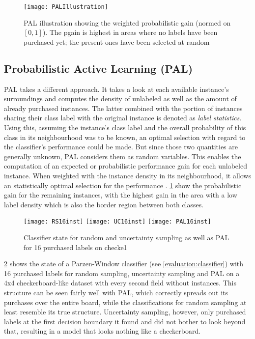 \begin{figure}[h]
	\centering
	\texttt{[image: PALIllustration]}
	\caption{PAL illustration showing the weighted probabilistic gain (normed on $[0, 1]$). The pgain is highest in areas where no labels have been purchased yet; the present ones have been selected at random}
	\label{fig:PALIllustration}
\end{figure}

\subsection{Probabilistic Active Learning (PAL)}
PAL takes a different approach. It takes a look at each available instance's surroundings and computes the density of unlabeled as well as the amount of already purchased instances. The latter combined with the portion of instances sharing their class label with the original instance is denoted as \textit{label statistics}. Using this, assuming the instance's class label and the overall probability of this class in its neighbourhood was to be known, an optimal selection with regard to the classifier's performance could be made. But since those two quantities are generally unknown, PAL considers them as random variables. This enables the computation of an expected or probabilistic performance gain for each unlabeled instance. When weighted with the instance density in its neighbourhood, it allows an statistically optimal selection for the performance \cite{KremplEtAl2014}. \ref{fig:PALIllustration} show the probabilistic gain for the remaining instances, with the highest gain in the area with a low label density which is also the border region between both classes.

\begin{figure}[h]
	\centering
	\texttt{[image: RS16inst]}
	\texttt{[image: UC16inst]}
	\texttt{[image: PAL16inst]}
	\caption{Classifier state for random and uncertainty sampling as well as PAL for 16 purchased labels on checke1}
	\label{fig:ALillustration}
\end{figure}

\ref{fig:ALillustration} shows the state of a Parzen-Window classifier (see \ref{evaluation:classifier}) with 16 purchased labels for random sampling, uncertainty sampling and PAL on a 4x4 checkerboard-like dataset with every second field without instances. This structure can be seen fairly well with PAL, which correctly spreads out its purchases over the entire board, while the classifications for random sampling at least resemble its true structure. Uncertainty sampling, however, only purchased labels at the first decision boundary it found and did not bother to look beyond that, resulting in a model that looks nothing like a checkerboard.


